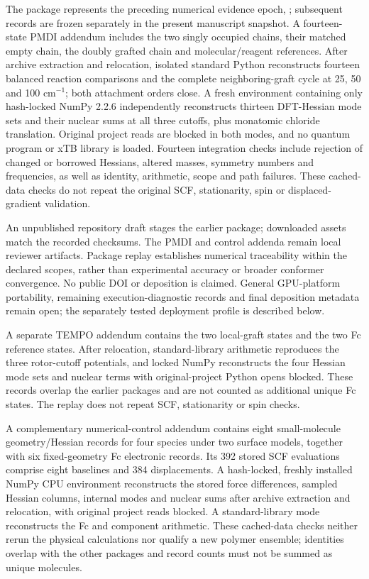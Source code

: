 \documentclass[11pt]{article}
\begin{document}
The package represents the preceding numerical evidence epoch, ; subsequent records are frozen separately in the present manuscript snapshot. A fourteen-state PMDI addendum includes the two singly occupied chains, their matched empty chain, the doubly grafted chain and molecular/reagent references. After archive extraction and relocation, isolated standard Python reconstructs fourteen balanced reaction comparisons and the complete neighboring-graft cycle at 25, 50 and 100 cm$^{-1}$; both attachment orders close. A fresh environment containing only hash-locked NumPy 2.2.6 independently reconstructs thirteen DFT-Hessian mode sets and their nuclear sums at all three cutoffs, plus monatomic chloride translation. Original project reads are blocked in both modes, and no quantum program or xTB library is loaded. Fourteen integration checks include rejection of changed or borrowed Hessians, altered masses, symmetry numbers and frequencies, as well as identity, arithmetic, scope and path failures. These cached-data checks do not repeat the original SCF, stationarity, spin or displaced-gradient validation.

An unpublished repository draft stages the earlier package; downloaded assets match the recorded checksums. The PMDI and control addenda remain local reviewer artifacts. Package replay establishes numerical traceability within the declared scopes, rather than experimental accuracy or broader conformer convergence. No public DOI or deposition is claimed. General GPU-platform portability, remaining execution-diagnostic records and final deposition metadata remain open; the separately tested deployment profile is described below.

A separate TEMPO addendum contains the two local-graft states and the two Fc reference states. After relocation, standard-library arithmetic reproduces the three rotor-cutoff potentials, and locked NumPy reconstructs the four Hessian mode sets and nuclear terms with original-project Python opens blocked. These records overlap the earlier packages and are not counted as additional unique Fc states. The replay does not repeat SCF, stationarity or spin checks.

A complementary numerical-control addendum contains eight small-molecule geometry/Hessian records for four species under two surface models, together with six fixed-geometry Fc electronic records. Its 392 stored SCF evaluations comprise eight baselines and 384 displacements. A hash-locked, freshly installed NumPy CPU environment reconstructs the stored force differences, sampled Hessian columns, internal modes and nuclear sums after archive extraction and relocation, with original project reads blocked. A standard-library mode reconstructs the Fc and component arithmetic. These cached-data checks neither rerun the physical calculations nor qualify a new polymer ensemble; identities overlap with the other packages and record counts must not be summed as unique molecules.
\end{document}

